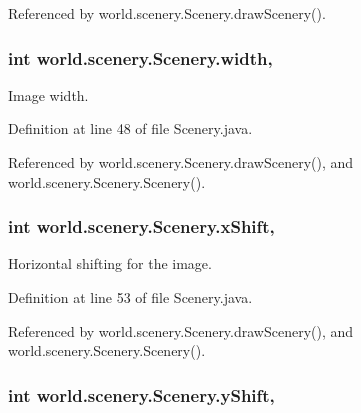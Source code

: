 Referenced by world.\-scenery.\-Scenery.\-draw\-Scenery().

\hypertarget{classworld_1_1scenery_1_1_scenery_ad10b27080954e2fc06aa1718f47c4ce1}{
\subsubsection[{width}]{\setlength{\rightskip}{0pt plus 5cm}int world.\-scenery.\-Scenery.\-width\hspace{0.3cm}{\ttfamily [protected]}, {\ttfamily [inherited]}}}\label{classworld_1_1scenery_1_1_scenery_ad10b27080954e2fc06aa1718f47c4ce1}


Image width. 



Definition at line 48 of file Scenery.\-java.



Referenced by world.\-scenery.\-Scenery.\-draw\-Scenery(), and world.\-scenery.\-Scenery.\-Scenery().

\hypertarget{classworld_1_1scenery_1_1_scenery_a0999f105f7630fd67fd9d440da6983aa}{
\subsubsection[{x\-Shift}]{\setlength{\rightskip}{0pt plus 5cm}int world.\-scenery.\-Scenery.\-x\-Shift\hspace{0.3cm}{\ttfamily [protected]}, {\ttfamily [inherited]}}}\label{classworld_1_1scenery_1_1_scenery_a0999f105f7630fd67fd9d440da6983aa}


Horizontal shifting for the image. 



Definition at line 53 of file Scenery.\-java.



Referenced by world.\-scenery.\-Scenery.\-draw\-Scenery(), and world.\-scenery.\-Scenery.\-Scenery().

\hypertarget{classworld_1_1scenery_1_1_scenery_ac9ca2c17cf6920deffe490c013b0e638}{
\subsubsection[{y\-Shift}]{\setlength{\rightskip}{0pt plus 5cm}int world.\-scenery.\-Scenery.\-y\-Shift\hspace{0.3cm}{\ttfamily [protected]}, {\ttfamily [inherited]}}}\label{classworld_1_1scenery_1_1_scenery_ac9ca2c17cf6920deffe490c013b0e638}


